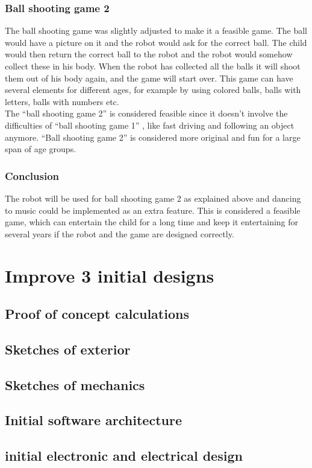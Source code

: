 \documentclass[11pt,twoside,a4paper]{report}
\begin{document}
\subsection{Ball shooting game 2}
The ball shooting game was slightly adjusted to make it a feasible game. The ball would have a picture on it and the robot would ask for the correct ball. The child would then return the correct ball to the robot and the robot would somehow collect these in his body. When the robot has collected all the balls it will shoot them out of his body again, and the game will start over. This game can have several elements for different ages, for example by using colored balls, balls with letters, balls with numbers etc. \\
The “ball shooting game 2” is considered feasible since it doesn’t involve the difficulties of “ball shooting game 1” , like fast driving and following an object anymore. “Ball shooting game 2” is considered more original and fun for a large span of age groups.
\subsection{Conclusion}
The robot will be used for ball shooting game 2 as explained above and dancing to music could be implemented as an extra feature. This is considered a feasible game, which can entertain the child for a long time and keep it entertaining for several years if the robot and the game are designed correctly.

\chapter{Improve 3 initial designs}
\section{Proof of concept calculations}
\section{Sketches of exterior}
\section{Sketches of mechanics}
\section{Initial software architecture}
\section{initial electronic and electrical design}
\end{document}
